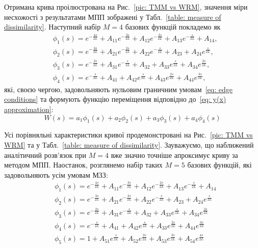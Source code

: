 \documentclass{mathreport}
\begin{document}
Отримана крива проілюстрована на Рис.~\ref{pic: TMM vs WRM}, значення міри несхожості з результатами МПП зображені у Табл.~\ref{table: measure of dissimilarity}. Наступний набір $M=4$ базових функцій покладемо як 
\begin{align}
    & \phi_1(s) = e^{-\frac{4s}{2L}} + A_{11}e^{-\frac{3s}{2L}} + A_{12}e^{-\frac{2s}{2L}} + A_{13}e^{-\frac{s}{2L}} + A_{14}, \label{eq: M=4 trial phi1(x)} \\
    & \phi_2(s) = e^{-\frac{3s}{2L}} + A_{21}e^{-\frac{2s}{2L}} + A_{22}e^{-\frac{s}{2L}} + A_{23} + A_{24}e^{\frac{s}{2L}}, \label{eq: M=4 trial phi2(x)} \\
    & \phi_3(s) = e^{-\frac{2s}{2L}} + A_{31}e^{-\frac{s}{2L}} + A_{32} + A_{33}e^{\frac{s}{2L}} + A_{34}e^{\frac{2s}{2L}}, \label{eq: M=4 trial phi3(x)} \\
    & \phi_4(s) = e^{-\frac{s}{2L}} + A_{41} + A_{42}e^{\frac{s}{2L}} + A_{43}e^{\frac{2s}{2L}} + A_{44}e^{\frac{3s}{2L}}, \label{eq: M=4 trial phi4(x)}
\end{align}
які, своєю чергою, задовольняють нульовим граничним умовам~\eqref{eq: edge conditions} та формують функцію переміщення відповідно до~\eqref{eq: y(x) approximation}:
\begin{equation}\label{eq: W(s) M=4 approximation}
    W(s) = a_1\phi_1(s) + a_2\phi_2(s) + a_3\phi_3(s) + a_4\phi_4(s)
\end{equation}

Усі порівняльні характеристики кривої продемонстровані на Рис.~\ref{pic: TMM vs WRM} та у Табл.~\ref{table: measure of dissimilarity}. Зауважуємо, що наближений аналітичний розв'язок при $M=4$ вже значно точніше апроксимує криву за методом МПП. Наостанок, розглянемо набір таких $M=5$ базових функцій, які задовольняють усім умовам МЗЗ:
\begin{align}
    & \phi_1(s) = e^{-\frac{4s}{2L}} + A_{11}e^{-\frac{3s}{2L}} + A_{12}e^{-\frac{2s}{2L}} + A_{13}e^{-\frac{s}{2L}} + A_{14} \label{eq: M=5 trial phi1(x)} \\
    & \phi_2(s) = e^{-\frac{3s}{2L}} + A_{21}e^{-\frac{2s}{2L}} + A_{22}e^{-\frac{s}{2L}} + A_{23} + A_{24}e^{\frac{s}{2L}} \label{eq: M=5 trial phi2(x)} \\
    & \phi_3(s) = e^{-\frac{2s}{2L}} + A_{31}e^{-\frac{s}{2L}} + A_{32} + A_{33}e^{\frac{s}{2L}} + A_{34}e^{\frac{2s}{2L}} \label{eq: M=5 trial phi3(x)} \\
    & \phi_4(s) = e^{-\frac{s}{2L}} + A_{41} + A_{42}e^{\frac{s}{2L}} + A_{33}e^{\frac{2s}{2L}} + A_{44}e^{\frac{3s}{2L}} \label{eq: M=5 trial phi4(x)} \\
    & \phi_5(s) = 1 + A_{51}e^{\frac{s}{2L}} + A_{52}e^{\frac{2s}{2L}} + A_{53}e^{\frac{3s}{2L}} + A_{54}e^{\frac{4s}{2L}} \label{eq: M=5 trial phi5(x)}
\end{align}
\end{document}
